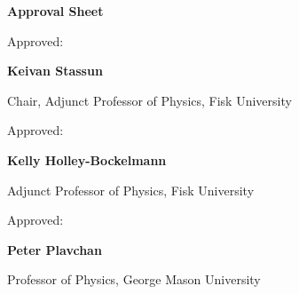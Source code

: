 {}

\noindent \textbf{Approval Sheet}
\vspace*{\fill}

\begin{flushleft}
    
    
Approved: \hrulefill 

\hspace*{0mm}\phantom{Approved: }\textbf{Keivan Stassun} 

\hspace*{0mm}\phantom{Approved: }Chair, Adjunct Professor of Physics, Fisk University
\vspace{20mm}

Approved: \hrulefill 

\hspace*{0mm}\phantom{Approved: }\textbf{Kelly Holley-Bockelmann}

\hspace*{0mm}\phantom{Approved: }Adjunct Professor of Physics, Fisk University
\vspace{20mm}

Approved: \hrulefill 

\hspace*{0mm}\phantom{Approved: }\textbf{Peter Plavchan}

\hspace*{0mm}\phantom{Approved: }Professor of Physics, George Mason University


\end{flushleft}
\vspace*{\fill}
